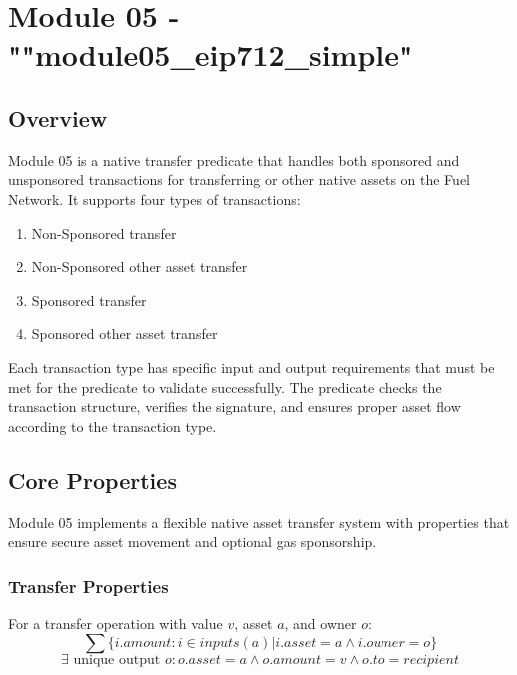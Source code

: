 \newpage
\section{Module 05 - {\ttfamily ""module05\_eip712\_simple"}}
\label{sec:module05_predicate}

\subsection{Overview}
Module 05 is a native transfer predicate that handles both sponsored and unsponsored transactions for transferring  or other
native assets on the Fuel Network. It supports four types of transactions:\\

\begin{enumerate}
\item Non-Sponsored  transfer
\item Non-Sponsored other asset transfer
\item Sponsored  transfer
\item Sponsored other asset transfer
\end{enumerate}

Each transaction type has specific input and output requirements that must be met for the predicate to validate successfully. The predicate
checks the transaction structure, verifies the signature, and ensures proper asset flow according to the transaction type.




%

\subsection{Core Properties}
Module 05 implements a flexible native asset transfer system with properties that ensure secure asset movement and optional gas sponsorship.

\subsubsection{Transfer Properties}
For a transfer operation with value $v$, asset $a$, and owner $o$:
\[ \sum \{ i.amount : i \in inputs(a) | i.asset = a \land i.owner = o \} \]
\[ \exists \text{ unique output } o : o.asset = a \land o.amount = v \land o.to = recipient \]

